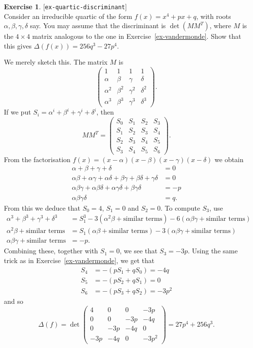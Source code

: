 \documentclass{amsart}
\newcommand{\al}        {\alpha}
\newcommand{\bt}        {\beta}
\newcommand{\gm}        {\gamma}
\newcommand{\dl}        {\delta}
\newcommand{\Dl}        {\Delta}
\newcommand{\tm}        {\times}
\renewcommand{\:}{\colon}
\newcommand{\lastexlabel}{}
\newcommand{\exlabel}[1]{
 \global\def\lastexlabel{#1}\label{#1}[\texttt{#1}]\ \\
}
\newcommand{\exlabel}[1]{
 \global\def\lastexlabel{#1}\label{#1}
}
\newenvironment{solution}{\SolutionInline}{\endSolutionInline}
\theoremstyle{definition}
\newtheorem{exercise}{Exercise}[section]
\renewenvironment{solution}{\SolutionAtEnd}{\endSolutionAtEnd}
\begin{document}
\begin{exercise}\exlabel{ex-quartic-discriminant}
 Consider an irreducible quartic of the form $f(x)=x^4+px+q$, with
 roots $\al,\bt,\gm,\dl$ say.  You may assume that the discriminant is
 $\det(MM^T)$, where $M$ is the $4\tm 4$ matrix analogous to the one
 in Exercise~\ref{ex-vandermonde}.  Show that this gives
 $\Dl(f(x))=256q^3-27p^4$.
\end{exercise}
\begin{solution}
 We merely sketch this.  The matrix $M$ is
 \[  \begin{pmatrix}
      1     & 1     & 1     & 1         \\
      \al   & \bt   & \gm   & \delta    \\
      \al^2 & \bt^2 & \gm^2 & \delta^2  \\
      \al^3 & \bt^3 & \gm^3 & \delta^3
     \end{pmatrix}.
 \]
 If we put $S_i=\al^i+\bt^i+\gm^i+\delta^i$, then
 \[ MM^T = \begin{pmatrix}
            S_0 & S_1 & S_2 & S_3\\
            S_1 & S_2 & S_3 & S_4\\
            S_2 & S_3 & S_4 & S_5\\
            S_3 & S_4 & S_5 & S_6
           \end{pmatrix}.
 \]
 From the factorisation $f(x)=(x-\al)(x-\bt)(x-\gm)(x-\dl)$ we obtain
 \begin{align*}
  \al+\bt+\gm+\dl &= 0 \\
  \al\bt+\al\gm+\al\dl+\bt\gm+\bt\dl+\gm\dl &= 0 \\
  \al\bt\gm+\al\bt\dl+\al\gm\dl+\bt\gm\dl &= -p \\
  \al\bt\gm\dl &= q.
 \end{align*}
 From this we deduce that $S_0=4$, $S_1=0$ and $S_2=0$.  To compute $S_3$, use
 \begin{align*}
  \al^3+\bt^3+\gm^3+\delta^3 &=
    S_1^3
    -3(\al^2\bt+\mbox{similar terms})
    -6(\al\bt\gm+\mbox{similar terms}) \\
  \al^2\bt+\mbox{similar terms} &=
    S_1(\al\bt+\mbox{similar terms})
    -3(\al\bt\gm+\mbox{similar terms}) \\
  \al\bt\gm+\mbox{similar terms} &= -p.
 \end{align*}
 Combining these, together with $S_1=0$, we see that $S_3=-3p$.
 Using the same trick as in Exercise~\ref{ex-vandermonde}, we get that
 \begin{align*}
  S_4 &= -(pS_1+qS_0) =-4q  \\
  S_5 &= -(pS_2+qS_1) =0    \\
  S_6 &= -(pS_3+qS_2) =-3p^2
 \end{align*}
 and so
 \[ \Dl(f) = \det
     \begin{pmatrix}
      4   & 0   & 0   & -3p    \\
      0   & 0   & -3p & -4q    \\
      0   & -3p & -4q & 0      \\
      -3p & -4q & 0   & -3p^2
     \end{pmatrix} = 27p^4+256q^3.
 \] 
\end{solution}
\end{document}
